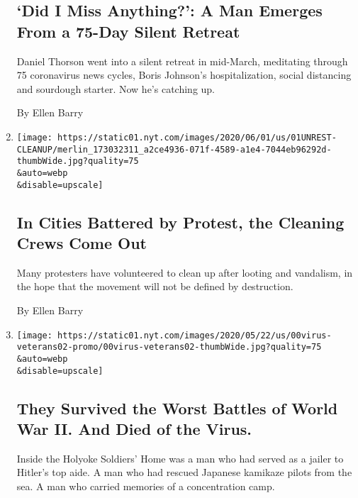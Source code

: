 \begin{enumerate}
{  \subsection{`Did I Miss Anything?': A Man Emerges From a 75-Day Silent
  Retreat}\label{did-i-miss-anything-a-man-emerges-from-a-75-day-silent-retreat}}

  Daniel Thorson went into a silent retreat in mid-March, meditating
  through 75 coronavirus news cycles, Boris Johnson's hospitalization,
  social distancing and sourdough starter. Now he's catching up.

  By Ellen Barry
\item
  \href{/2020/06/01/us/george-floyd-protests-cleanup.html}{}

  \texttt{[image: https://static01.nyt.com/images/2020/06/01/us/01UNREST-CLEANUP/merlin\_173032311\_a2ce4936-071f-4589-a1e4-7044eb96292d-thumbWide.jpg?quality=75\\\&auto=webp\\\&disable=upscale]}

  \hypertarget{in-cities-battered-by-protest-the-cleaning-crews-come-out}{%
  \subsection{In Cities Battered by Protest, the Cleaning Crews Come
  Out}\label{in-cities-battered-by-protest-the-cleaning-crews-come-out}}

  Many protesters have volunteered to clean up after looting and
  vandalism, in the hope that the movement will not be defined by
  destruction.

  By Ellen Barry
\item
  \href{/2020/05/24/us/they-survived-the-worst-battles-of-world-war-ii-and-died-of-the-virus.html}{}

  \texttt{[image: https://static01.nyt.com/images/2020/05/22/us/00virus-veterans02-promo/00virus-veterans02-thumbWide.jpg?quality=75\\\&auto=webp\\\&disable=upscale]}

  \hypertarget{they-survived-the-worst-battles-of-world-war-ii-and-died-of-the-virus}{%
  \subsection{They Survived the Worst Battles of World War II. And Died
  of the
  Virus.}\label{they-survived-the-worst-battles-of-world-war-ii-and-died-of-the-virus}}

  Inside the Holyoke Soldiers' Home was a man who had served as a jailer
  to Hitler's top aide. A man who had rescued Japanese kamikaze pilots
  from the sea. A man who carried memories of a concentration camp.


\end{enumerate}
